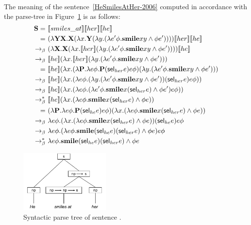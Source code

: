 \begin{example} \label{ex:2006:HeSmilesAtHer} The meaning of the sentence~\eqref{HeSmilesAtHer-2006} computed in accordance with the parse-tree in Figure~\ref{fig:ptS3-2006}  is as follows:
\begin{align}
\S = \ & \I{smiles\_at} \I{her} \I{he} \notag \\
 = \ & (\lambda \Y2 \X2. \X2( \lambda \x1. \Y2 (\lambda \y1. ( \lambda e' \phi. \textbf{smile} \x1 \y1 \land \phi e' ))) )  \I{her} \I{he} \notag \\
\bconv \ & (\lambda  \X2. \X2( \lambda \x1.  \I{her}  (\lambda \y1. ( \lambda e' \phi. \textbf{smile} \x1 \y1 \land \phi e' ))) ) \I{he} \notag \\
\bconv \ &   \I{he} ( \lambda \x1.  \I{her}  (\lambda \y1. ( \lambda e' \phi. \textbf{smile} \x1 \y1 \land \phi e' ))) \notag  \\
= \ &   \I{he} ( \lambda \x1.  (\lambda \P2. \lambda e \phi. \P2 (\selK_{her}e)e\phi)  (\lambda \y1. ( \lambda e' \phi. \textbf{smile} \x1 \y1 \land \phi e' ))) \notag \\
 \bconv \ &   \I{he} ( \lambda \x1.  (\lambda e \phi.  (\lambda \y1. ( \lambda e' \phi. \textbf{smile} \x1 \y1 \land \phi e' )) (\selK_{her}e)e\phi) ) \notag \\
  \bconv \ &   \I{he} ( \lambda \x1.  (\lambda e \phi.   ( \lambda e' \phi. \textbf{smile} \x1  (\selK_{her}e) \land \phi e' ) e\phi) ) \notag \\
 \bred \ &   \I{he} ( \lambda \x1.  (\lambda e \phi.  \textbf{smile} \x1  (\selK_{her}e) \land \phi e) ) \notag \\
  = \ &  (\lambda \P2. \lambda e \phi. \P2 (\selK_{he}e)e\phi) ( \lambda \x1.  (\lambda e \phi.  \textbf{smile} \x1  (\selK_{her}e) \land \phi e) ) \notag \\
\bconv \ & \lambda e \phi. ( \lambda \x1.  (\lambda e \phi.  \textbf{smile} \x1  (\selK_{her}e) \land \phi e) )  (\selK_{he}e)e\phi \notag \\
\bconv \ & \lambda e \phi.   (\lambda e \phi.  \textbf{smile}  (\selK_{he}e)  (\selK_{her}e) \land \phi e) e\phi \notag \\
\bred \ & \lambda e \phi.   \textbf{smile}  (\selK_{he}e)  (\selK_{her}e) \land \phi e \label{eq:2006:HeSmilesAtHer}
\end{align}
\end{example}

\begin{figure}[h]
 \centering
    \includegraphics[width=0.4\textwidth]{images/HeSmilesatHer.pdf}
\caption{Syntactic parse tree of sentence .} \label{fig:ptS3-2006}
\end{figure}

